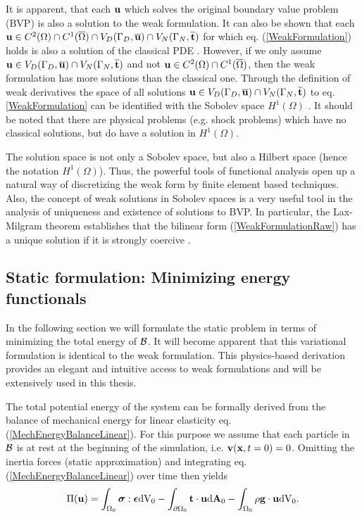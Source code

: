 It is apparent, that each $\mathbf {u} $ which solves the original boundary value problem (BVP) is also a solution to the weak formulation. It can also be shown that each $\mathbf {u}  \in {C} ^{2}(\Omega) \cap {C} ^{1} (\overline{\Omega}) \cap V_D(\Gamma _D,\overline{\mathbf {u} }) \cap V_N(\Gamma _N,\overline{\mathbf {t} })$ for which eq. (\ref{WeakFormulation}) holds is also a solution of the classical PDE \cite{Braess2007}. However, if we only assume $\mathbf {u}  \in V_D(\Gamma _D,\overline{\mathbf {u} }) \cap V_N(\Gamma _N,\overline{\mathbf {t} })$ and not $\mathbf {u}  \in {C} ^{2}(\Omega) \cap {C} ^{1} (\overline{\Omega})$, then the weak formulation has more solutions than the classical one. Through the definition of weak derivatives the space of all solutions $\mathbf {u}  \in  V_D(\Gamma _D,\overline{\mathbf {u} }) \cap V_N(\Gamma _N,\overline{\mathbf {t} })$ to eq. \ref{WeakFormulation} can be identified with the Sobolev space $H^1(\Omega)$ \cite{Braess2007}. It should be noted that there are physical problems (e.g. shock problems) which have no classical solutions, but do have a solution in $H^1(\Omega)$. 

The solution space is not only a Sobolev space, but also a Hilbert space (hence the notation $H^1(\Omega)$).  Thus, the powerful tools of functional analysis open up a natural way of discretizing the weak form by finite element based techniques. Also, the concept of weak solutions in Sobolev spaces is a very useful tool in the analysis of uniqueness and existence of solutions to BVP. In particular, the Lax-Milgram theorem establishes that the bilinear form (\ref{WeakFormulationRaw}) has a unique solution if it is strongly coercive \cite{Braess2007}.


\subsection{Static formulation: Minimizing energy functionals}

In the following section we will formulate the static problem in terms of minimizing the total energy of $\mathcal{B} $. It will become apparent that this variational formulation is identical to the weak formulation. This physics-based derivation provides an elegant and intuitive access to weak formulations and will be extensively used in this thesis. 

The total potential energy of the system can be formally derived from the balance of mechanical energy for linear elasticity eq. (\ref{MechEnergyBalanceLinear}). For this purpose we assume that each particle in $\mathcal{B} $ is at rest at the beginning of the simulation, i.e. $\mathbf {v} (\mathbf {x} ,t=0)=0$. Omitting the inertia forces (static approximation) and integrating eq. (\ref{MechEnergyBalanceLinear}) over time then yields
 \begin{equation}
 \Pi(\mathbf {u} ) =     \int _{\Omega _0}  \boldsymbol{\sigma} : \boldsymbol{\epsilon}   \textnormal{dV}_0      -  \int _{\partial \Omega _0}  \mathbf {t}  \cdot \mathbf {u}     \textnormal{d}\mathbf{A}_0  -  \int _{\Omega _0}  \rho \mathbf {g}  \cdot \mathbf {u}   \textnormal{dV}_0.
\label{MechEnergyStaticLinear}
\end{equation}

